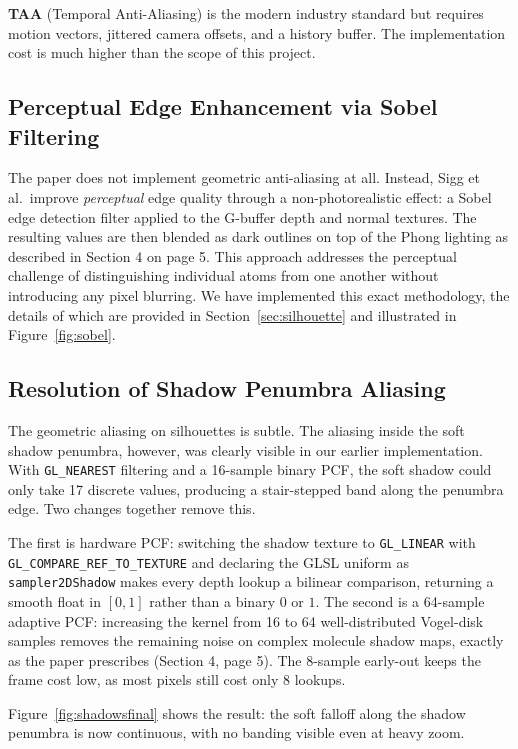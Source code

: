 \documentclass[12pt, a4paper]{article}
\begin{document}
\textbf{TAA} (Temporal Anti-Aliasing) is the modern industry standard but requires motion vectors, jittered camera offsets, and a history buffer. The implementation cost is much higher than the scope of this project.

\subsection{Perceptual Edge Enhancement via Sobel Filtering}

The paper does not implement geometric anti-aliasing at all. Instead, Sigg et al.\ improve \emph{perceptual} edge quality through a non-photorealistic effect: a Sobel edge detection filter applied to the G-buffer depth and normal textures. The resulting values are then blended as dark outlines on top of the Phong lighting as described in Section 4 on page 5. This approach addresses the perceptual challenge of distinguishing individual atoms from one another without introducing any pixel blurring. We have implemented this exact methodology, the details of which are provided in Section~\ref{sec:silhouette} and illustrated in Figure~\ref{fig:sobel}.

\subsection{Resolution of Shadow Penumbra Aliasing}

The geometric aliasing on silhouettes is subtle. The aliasing inside the soft shadow penumbra, however, was clearly visible in our earlier implementation. With \texttt{GL\_NEAREST} filtering and a 16-sample binary PCF, the soft shadow could only take 17 discrete values, producing a stair-stepped band along the penumbra edge. Two changes together remove this.

The first is hardware PCF: switching the shadow texture to \texttt{GL\_LINEAR} with \texttt{GL\_COMPARE\_\allowbreak{}REF\_TO\_\allowbreak{}TEXTURE} and declaring the GLSL uniform as \texttt{sampler2DShadow} makes every depth lookup a bilinear comparison, returning a smooth float in $[0, 1]$ rather than a binary $0$ or $1$. The second is a 64-sample adaptive PCF: increasing the kernel from 16 to 64 well-distributed Vogel-disk samples removes the remaining noise on complex molecule shadow maps, exactly as the paper prescribes (Section 4, page 5). The 8-sample early-out keeps the frame cost low, as most pixels still cost only 8 lookups.

Figure~\ref{fig:shadowsfinal} shows the result: the soft falloff along the shadow penumbra is now continuous, with no banding visible even at heavy zoom.
\end{document}
